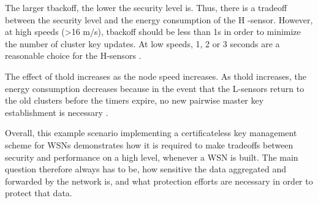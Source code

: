 \documentclass[12pt,a4paper,twoside]{report}
\begin{document}
The larger tbackoff, the lower the security level is. Thus, there is a tradeoff between the security level and the energy consumption of the H -sensor. However, at high speeds (>16 m/s), tbackoff should be less than 1s in order to minimize the number of cluster key updates. At low speeds, 1, 2 or 3 seconds are a reasonable choice for the H-sensors \cite{seo;etal:2015}.\par 
The effect of thold increases as the node speed increases. As thold increases, the energy consumption decreases because in the event that the L-sensors return to the old clusters before the timers expire, no new pairwise master key establishment is necessary \cite{seo;etal:2015}.\par
Overall, this example scenario implementing a certificateless key management scheme for WSNs demonstrates how it is required to make tradeoffs between security and performance on a high level, whenever a WSN is built. The main question therefore always has to be, how sensitive the data aggregated and forwarded by the network is, and what protection efforts are necessary in order to protect that data.
\end{document}
